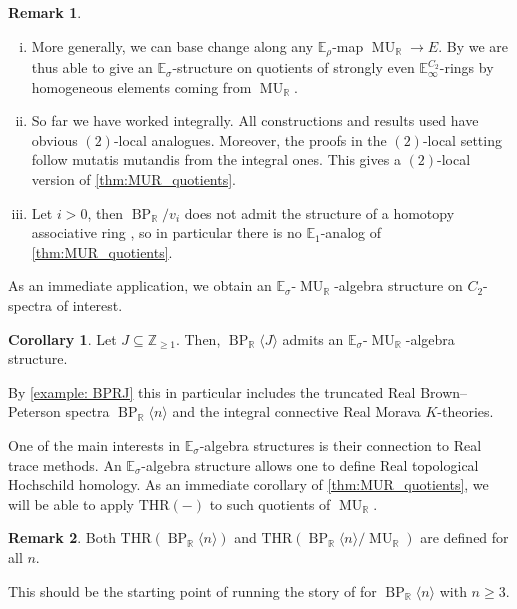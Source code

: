 \documentclass[a4paper, 10pt]{article}
\newcommand{\E}{\mathbb E}  %
\newcommand{\Z}{\mathbb{Z}}
\newcommand{\MU}{\operatorname{MU}}
\newcommand{\MUR}{{\MU_{\mathbb{R}}}}
\newcommand{\BP}{\operatorname{BP}}
\newcommand{\BPR}{{\BP_{\mathbb{R}}}}
\newcommand{\BPRn}{{\BP_{\mathbb{R}}\langle n\rangle}}
\newcommand{\THR}{\mathrm{THR}}
\theoremstyle{definition}
\newtheorem{remark}[remark]{Remark}
\newtheorem{corollary}[corollary]{Corollary}
\begin{document}
\begin{remark} \hfill \label{remark: MUR quotient theorem}
    \begin{enumerate}[(i)]
        \item More generally, we can base change along any $\E_{\rho}$-map $\MUR \to E$. By \cite[Corollary 6.2.2]{quinnZhu2026multiplicativeequivariantthomspectra} we are thus able to give an $\E_{\sigma}$-structure on quotients of strongly even $\E_{\infty}^{C_2}$-rings by homogeneous elements coming from $\MUR$.
        \item So far we have worked integrally. All constructions and results used have obvious \((2)\)-local analogues. 
        Moreover, the proofs in the \((2)\)-local setting follow mutatis mutandis from the integral ones. This gives a \((2)\)-local version of \cref{thm:MUR_quotients}.
        \item Let $i > 0$, then $\BPR/v_i$ does not admit the structure of a homotopy associative ring \cite[Example 3.15]{bachmannHahn2022nilpotencenormedmglmodules}, so in particular there is no $\E_1$-analog of \cref{thm:MUR_quotients}.
    \end{enumerate}
\end{remark}

As an immediate application, we obtain an $\E_{\sigma}$-$\MUR$-algebra structure on $C_2$-spectra of interest.
\begin{corollary}\label{cor:BPRnkRn}
        Let $J \subseteq \Z_{\geq 1}$. Then, $\BPR \langle J \rangle$ admits an $\E_{\sigma}$-$\MUR$-algebra structure. 
\end{corollary}

By \cref{example: BPRJ} this in particular includes the truncated Real Brown--Peterson spectra $\BPRn$ and the integral connective Real Morava $K$-theories.

One of the main interests in \(\E_\sigma\)-algebra structures is their connection to Real trace methods.
An \(\E_\sigma\)-algebra structure allows one to define Real topological Hochschild homology. As an immediate corollary of \cref{thm:MUR_quotients}, we will be able to apply \(\THR(-)\) to such quotients of \(\MUR\).

\begin{remark}
    Both \(\THR(\BPRn)\) and \(\THR(\BPRn/\MUR)\) are defined for all \(n\).
\end{remark}
This should be the starting point of running the story of \cite{gabe2025realsyntomiccohomology} for $\BPRn$ with $n \geq 3$.
\end{document}

